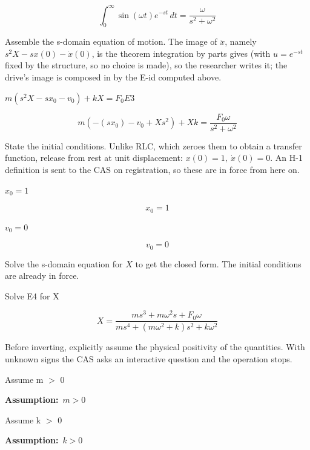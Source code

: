 \documentclass[dvipdfmx]{article}
\begin{document}
\begin{equation}
  \int_{0}^{\infty} \sin(\omega t) e^{-s t} \, dt = \frac{\omega}{s^2+\omega^2}
  \label{eq:E3}
\end{equation}

Assemble the s-domain equation of motion. The image of $\ddot x$, namely $s^2X - s x(0) - \dot x(0)$, is the theorem integration by parts gives (with $u=e^{-st}$ fixed by the structure, so no choice is made), so the researcher writes it; the drive's image is composed in by the E-id computed above.

$m (s^2 X - s x_0 - v_0) + k X = F_0 E3$

\begin{equation}
  m \left(-\left(s x_{0}\right)-v_{0}+X s^2\right)+X k=\frac{F_{0} \omega}{s^2+\omega^2}
  \label{eq:E4}
\end{equation}

State the initial conditions. Unlike RLC, which zeroes them to obtain a transfer function, release from rest at unit displacement: $x(0)=1,\ \dot x(0)=0$. An H-1 definition is sent to the CAS on registration, so these are in force from here on.

$x_0 = 1$

\begin{equation}
  x_0 = 1
  \label{eq:E5}
\end{equation}

$v_0 = 0$

\begin{equation}
  v_0 = 0
  \label{eq:E6}
\end{equation}

Solve the s-domain equation for $X$ to get the closed form. The initial conditions are already in force.

Solve E4 for X

\begin{equation}
  X = \frac{m s^3+m \omega^2 s+F_{0} \omega}{m s^4+\left(m \omega^2+k\right) s^2+k \omega^2}
  \label{eq:E7}
\end{equation}

Before inverting, explicitly assume the physical positivity of the quantities. With unknown signs the CAS asks an interactive question and the operation stops.

Assume m $>$ 0

\noindent\textbf{Assumption:}\ $\displaystyle m > 0$\par

Assume k $>$ 0

\noindent\textbf{Assumption:}\ $\displaystyle k > 0$\par
\end{document}
